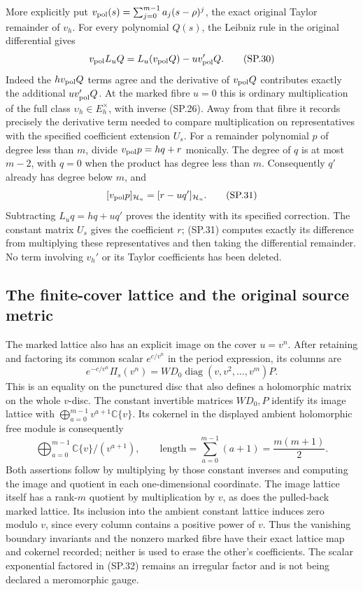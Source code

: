 More explicitly put
\(v_{\rm pol}(s)=\sum_{j=0}^{m-1}a_j(s-\rho)^j\), the exact
original Taylor remainder of \(v_h\). For every polynomial
\(Q(s)\), the Leibniz rule in the original differential gives
\[
 v_{\rm pol}L_uQ
 =L_u(v_{\rm pol}Q)-u v_{\rm pol}'Q.
 \tag{SP.30}\label{eq:sp-unitdifferential}
\]
Indeed the \(h v_{\rm pol}Q\) terms agree and the derivative
of \(v_{\rm pol}Q\) contributes exactly the additional
\(u v_{\rm pol}'Q\). At the marked fibre \(u=0\) this is
ordinary multiplication of the full class
\(\upsilon_h\in E_h^\times\), with inverse (SP.26).
Away from that fibre it records precisely the derivative
term needed to compare multiplication on representatives
with the specified coefficient extension \(U_s\).
For a remainder polynomial \(p\) of degree less than \(m\),
divide \(v_{\rm pol}p=hq+r\) monically. The degree of \(q\)
is at most \(m-2\), with \(q=0\) when the product has
degree less than \(m\). Consequently \(q'\) already has
degree below \(m\), and
\[
 [v_{\rm pol}p]_{\mathcal H_u}
       =[r-uq']_{\mathcal H_u}.
 \tag{SP.31}\label{eq:sp-unitremainder}
\]
Subtracting \(L_uq=hq+uq'\) proves the identity with its
specified correction. The constant matrix \(U_s\) gives
the coefficient \(r\); (SP.31) computes exactly its
difference from multiplying these representatives and
then taking the differential remainder.
No term involving \(v_h'\) or its Taylor coefficients has
been deleted.

\subsection{The finite-cover lattice and the original source metric}

The marked lattice also has an explicit image on the cover
\(u=v^n\). After retaining and factoring its common scalar
\(e^{c/v^n}\) in the period expression, its columns are
\[
 e^{-c/v^n}\Pi_s(v^n)
 =WD_0\operatorname{diag}(v,v^2,\ldots,v^m)P .
 \tag{SP.32}\label{eq:sp-coverlattice}
\]
This is an equality on the punctured disc that also defines
a holomorphic matrix on the whole \(v\)-disc.
The constant invertible matrices \(WD_0,P\) identify its
image lattice with
\(\bigoplus_{a=0}^{m-1}v^{a+1}\mathbb C\{v\}\).
Its cokernel in the displayed ambient holomorphic free
module is consequently
\[
 \bigoplus_{a=0}^{m-1}\mathbb C\{v\}/(v^{a+1}),\qquad
 \text{length}=\sum_{a=0}^{m-1}(a+1)=\frac{m(m+1)}2 .
 \tag{SP.33}\label{eq:sp-latticequotient}
\]
Both assertions follow by multiplying by those constant
inverses and computing the image and quotient in each
one-dimensional coordinate. The image lattice itself
has a rank-\(m\) quotient by multiplication by \(v\),
as does the pulled-back marked lattice.
Its inclusion into the ambient constant lattice induces
zero modulo \(v\), since every column contains a positive
power of \(v\). Thus the vanishing boundary invariants
and the nonzero marked fibre have their exact lattice
map and cokernel recorded; neither is used to erase the
other's coefficients. The scalar exponential factored
in (SP.32) remains an irregular factor and is not being
declared a meromorphic gauge.

